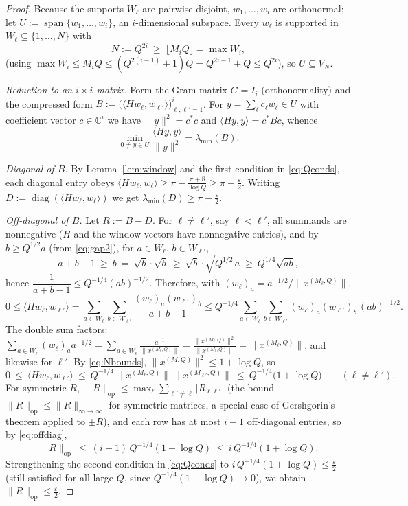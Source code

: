 \documentclass[12pt]{article}
\theoremstyle{remark}
\begin{document}
\begin{proof}
Because the supports $W_\ell$ are pairwise disjoint, $w_1,\dots,w_i$ are orthonormal; let
$U:=\operatorname{span}\{w_1,\dots,w_i\}$, an $i$-dimensional subspace. Every $w_\ell$ is supported
in $W_\ell\subseteq\{1,\dots,N\}$ with
\[
N:=Q^{2i}\ \ge\ \lfloor M_iQ\rfloor=\max W_i ,
\]
(using $\max W_i\le M_iQ\le(Q^{2(i-1)}+1)Q=Q^{2i-1}+Q\le Q^{2i}$), so $U\subseteq V_N$.

\smallskip
\noindent\emph{Reduction to an $i\times i$ matrix.} Form the Gram matrix $G=I_i$ (orthonormality)
and the compressed form $B:=\bigl(\langle Hw_\ell,w_{\ell'}\rangle\bigr)_{\ell,\ell'=1}^i$. For
$y=\sum_\ell c_\ell w_\ell\in U$ with coefficient vector $c\in\mathbb C^i$ we have
$\|y\|^2=c^*c$ and $\langle Hy,y\rangle=c^*Bc$, whence
\[
\min_{0\ne y\in U}\frac{\langle Hy,y\rangle}{\|y\|^2}=\lambda_{\min}(B).
\]

\smallskip
\noindent\emph{Diagonal of $B$.} By Lemma~\ref{lem:window} and the first condition in
\eqref{eq:Qconds}, each diagonal entry obeys
$\langle Hw_\ell,w_\ell\rangle\ge\pi-\frac{\pi+8}{\log Q}\ge\pi-\tfrac{\varepsilon}{2}$. Writing
$D:=\operatorname{diag}(\langle Hw_\ell,w_\ell\rangle)$ we get
$\lambda_{\min}(D)\ge\pi-\tfrac{\varepsilon}{2}$.

\smallskip
\noindent\emph{Off-diagonal of $B$.} Let $R:=B-D$. For $\ell\ne\ell'$, say $\ell<\ell'$, all
summands are nonnegative ($H$ and the window vectors have nonnegative entries), and by
$b\ge Q^{1/2}a$ (from \eqref{eq:gap2}), for $a\in W_\ell$, $b\in W_{\ell'}$,
\[
a+b-1\ \ge\ b\ =\ \sqrt b\cdot\sqrt b\ \ge\ \sqrt b\cdot\sqrt{Q^{1/2}\,a}\ \ge\ Q^{1/4}\sqrt{ab},
\]
hence $\dfrac1{a+b-1}\le Q^{-1/4}(ab)^{-1/2}$. Therefore, with
$(w_\ell)_a=a^{-1/2}/\|x^{(M_\ell,Q)}\|$,
\[
0\le\langle Hw_\ell,w_{\ell'}\rangle
=\sum_{a\in W_\ell}\sum_{b\in W_{\ell'}}\frac{(w_\ell)_a(w_{\ell'})_b}{a+b-1}
\le Q^{-1/4}\sum_{a\in W_\ell}\sum_{b\in W_{\ell'}}(w_\ell)_a(w_{\ell'})_b\,(ab)^{-1/2}.
\]
The double sum factors:
$\sum_{a\in W_\ell}(w_\ell)_a a^{-1/2}=\sum_{a\in W_\ell}\frac{a^{-1}}{\|x^{(M_\ell,Q)}\|}
=\frac{\|x^{(M_\ell,Q)}\|^2}{\|x^{(M_\ell,Q)}\|}=\|x^{(M_\ell,Q)}\|$, and likewise for
$\ell'$. By \eqref{eq:Nbounds}, $\|x^{(M,Q)}\|^2\le1+\log Q$, so
\begin{equation}\label{eq:offdiag}
0\ \le\ \langle Hw_\ell,w_{\ell'}\rangle\ \le\ Q^{-1/4}\,\|x^{(M_\ell,Q)}\|\,\|x^{(M_{\ell'},Q)}\|
\ \le\ Q^{-1/4}\bigl(1+\log Q\bigr)\qquad(\ell\ne\ell').
\end{equation}
For symmetric $R$, $\|R\|_{\mathrm{op}}\le\max_\ell\sum_{\ell'\ne\ell}|R_{\ell\ell'}|$
(the bound $\|R\|_{\mathrm{op}}\le\|R\|_{\infty\to\infty}$ for symmetric matrices, a special case of
Gershgorin's theorem applied to $\pm R$), and each row has at most $i-1$ off-diagonal entries, so
by \eqref{eq:offdiag},
\[
\|R\|_{\mathrm{op}}\ \le\ (i-1)\,Q^{-1/4}(1+\log Q)\ \le\ i\,Q^{-1/4}(1+\log Q).
\]
Strengthening the second condition in \eqref{eq:Qconds} to
$i\,Q^{-1/4}(1+\log Q)\le\tfrac\varepsilon2$ (still satisfied for all large $Q$, since
$Q^{-1/4}(1+\log Q)\to0$), we obtain $\|R\|_{\mathrm{op}}\le\tfrac{\varepsilon}{2}$.


\end{proof}
\end{document}

